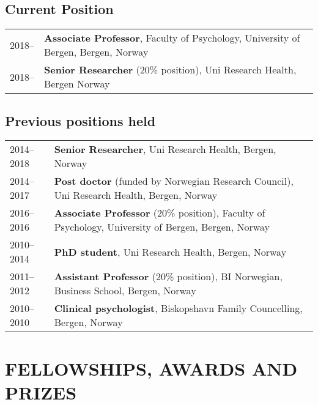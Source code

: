 \documentclass[11pt,a4paper,a4paper]{article}
\begin{document}
\hypertarget{current-position}{%
\subsection{Current Position}\label{current-position}}

\begin{tabular}{ll}
  2018-- & \textbf{Associate Professor}, Faculty of Psychology, University of Bergen, Bergen, Norway \\ 
  2018-- & \textbf{Senior Researcher} (20\% position), Uni Research Health, Bergen Norway \\ 
  \end{tabular}

\hypertarget{previous-positions-held}{%
\subsection{Previous positions held}\label{previous-positions-held}}

\begin{tabular}{ll}
  2014--2018 & \textbf{Senior Researcher}, Uni Research Health, Bergen, Norway \\ 
  2014--2017 & \textbf{Post doctor} (funded by Norwegian Research Council), Uni Research Health, Bergen, Norway \\ 
  2016--2016 & \textbf{Associate Professor}  (20\% position), Faculty of Psychology, University of Bergen, Bergen, Norway \\ 
  2010--2014 & \textbf{PhD student}, Uni Research Health, Bergen, Norway \\ 
  2011--2012 & \textbf{Assistant Professor} (20\% position), BI Norwegian, Business School, Bergen, Norway \\ 
  2010--2010 & \textbf{Clinical psychologist}, Biskopshavn Family Councelling, Bergen, Norway \\ 
  \end{tabular}

\hypertarget{fellowships-awards-and-prizes}{%
\section{FELLOWSHIPS, AWARDS AND PRIZES}\label{fellowships-awards-and-prizes}}
\end{document}
